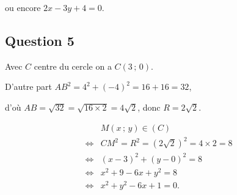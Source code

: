 ou encore \( 2x - 3y + 4 = 0 \).

\subsection*{Question 5}

Avec \(C\) centre du cercle on a \( C(3 \,;\, 0) \).

D'autre part \(AB^2 = 4^2 + (-4)^2 = 16 + 16 = 32\),

d'où \(AB = \sqrt{32} = \sqrt{16 \times 2} = 4\sqrt{2}\), donc \(R = 2\sqrt{2}\).

\begin{align*}
&M(x \,;\, y) \in (C) \\
\iff &CM^2 = R^2 = (2\sqrt{2})^2 = 4 \times 2 = 8 \\
\iff &(x - 3)^2 + (y - 0)^2 = 8 \\
\iff &x^2 + 9 - 6x + y^2 = 8 \\
\iff &x^2 + y^2 - 6x + 1 = 0.
\end{align*}
